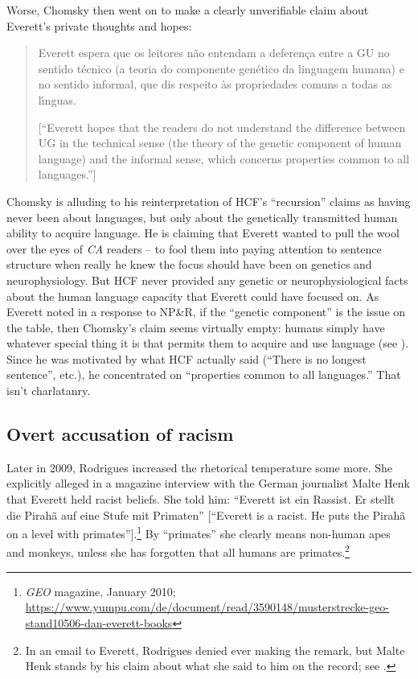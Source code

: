 \documentclass[output=paper,colorlinks,citecolor=brown
]{langscibook}
\begin{document}
Worse, Chomsky then went on to make a clearly unverifiable claim about
Everett's private thoughts and hopes:
\begin{quote}
Everett espera que os leitores n{ã}o entendam a deferença entre a GU no
sentido t{\'e}cnico (a teoria do componente gen{\'e}tico da linguagem
humana) e no sentido informal, que dis respeito {\`a}s propriedades comuns
a todas as l{\'\i}nguas.

[``Everett hopes that the readers do not understand the difference between
UG in the technical sense (the theory of the genetic component of human
language) and the informal sense, which concerns properties common to all
languages.'']
\end{quote}
Chomsky is alluding to his reinterpretation of HCF's ``recursion'' claims
as having never been about languages, but only about the genetically
transmitted human ability to acquire language. He is claiming that
Everett wanted to pull the wool over the eyes of \textit{CA} readers
-- to fool them into paying attention to sentence structure when
really he knew the focus should have been on genetics and neurophysiology.
But HCF never provided any genetic or neurophysiological facts about the
human language capacity that Everett could have focused on. As Everett
noted in a response to NP\&R, if the ``genetic component'' is the issue
on the table, then Chomsky's claim seems virtually empty: humans simply
have whatever special thing it is that permits them to acquire and use
language (see \citealt[439]{Everett09}). Since he was motivated by what
HCF actually said (``There is no longest sentence'', etc.), he concentrated
on ``properties common to all languages.'' That isn't charlatanry.

\subsection{Overt accusation of racism}

Later in 2009, Rodrigues increased the rhetorical temperature some
more. She explicitly alleged in a magazine interview with the German
journalist Malte Henk that Everett held racist beliefs. She told him:
``Everett ist ein Rassist.  Er stellt die Pirahã auf eine Stufe mit
Primaten'' [``Everett is a racist. He puts the Pirahã on a level
with primates''].\footnote{%
   \textit{GEO} magazine, January 2010;
   \url{https://www.yumpu.com/de/document/read/3590148/musterstrecke-geo-stand10506-dan-everett-books}}
By ``primates'' she clearly means non-human apes and monkeys, unless she has
forgotten that all humans are primates.\footnote{%
   In an email to Everett, Rodrigues denied ever making the remark,
   but Malte Henk stands by his claim about what she said to him on the
   record; see .}
\end{document}
